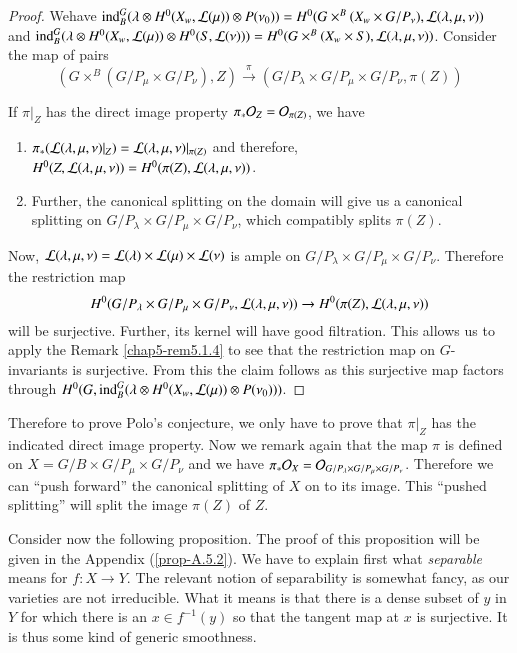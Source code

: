 \begin{proof}
We\pageoriginale have\label{page59} $\operatorname{ind}^{G}_{B}(\lambda\otimes
H^{0}(X_{w},\mathcal{L}(\mu))\otimes P(\nu_{0}))=H^{0}(G\times^{B}(X_{w}\times
G/P_{\nu}),\mathcal{L}(\lambda,\mu,\nu))$ and $\operatorname{ind}^{G}_{B}(\lambda\otimes
H^{0}(X_{w},\mathcal{L}(\mu))\otimes
H^{0}(S,\mathcal{L}(\nu)))=H^{0}(G\times^{B}(X_{w}\times
S),\mathcal{L}(\lambda,\mu,\nu))$. Consider the map of pairs
$$
(G\times^{B}(G/P_{\mu}\times
G/P_{\nu}),Z)\xrightarrow{\pi}(G/P_{\lambda}\times G/P_{\mu}\times
G/P_{\nu},\pi(Z)) 
$$

If $\pi|_{Z}$ has the direct image property
$\pi_{\ast}\mathcal{O}_{Z}=\mathcal{O}_{\pi(Z)}$, we have
\begin{enumerate}
\item
  $\pi_{\ast}(\mathcal{L}(\lambda,\mu,\nu)|_{Z})=\mathcal{L}(\lambda,\mu,\nu)|_{\pi(Z)}$
  and therefore,
  $H^{0}(Z,\mathcal{L}(\lambda,\mu,\nu))=H^{0}(\pi(Z),\mathcal{L}(\lambda,\mu,\nu))$. 

\item Further, the canonical splitting on the domain will give us a
  canonical splitting on $G/P_{\lambda}\times G/P_{\mu}\times
  G/P_{\nu}$, which compatibly splits $\pi(Z)$.
\end{enumerate}

Now, $\mathcal{L}(\lambda,\mu,\nu)=\mathcal{L}(\lambda)\times \mathcal{L}(\mu)\times \mathcal{L}(\nu)$ is
ample on $G/P_{\lambda}\times G/P_{\mu}\times G/P_{\nu}$. Therefore
the restriction map 
$$
H^{0}(G/P_{\lambda}\times G/P_{\mu}\times
G/P_{\nu},\mathcal{L}(\lambda,\mu,\nu))\to H^{0}(\pi(Z),\mathcal{L}(\lambda,\mu,\nu))
$$
will be surjective. Further, its kernel will have good
filtration. This allows us to apply the Remark \ref{chap5-rem5.1.4} to
see that the restriction map on $G$-invariants is surjective. From
this the claim follows as this surjective map factors through
$H^{0}(G,\operatorname{ind}^{G}_{B}(\lambda\otimes H^{0}(X_{w},\mathcal{L}(\mu))\otimes
P(\nu_{0})))$. 
\end{proof}

Therefore to prove Polo's conjecture, we only have to prove that
$\pi|_{Z}$ has the indicated direct image property. Now we remark
again that the map $\pi$ is defined on $X=G/B\times G/P_{\mu}\times
G/P_{\nu}$ and we have $\pi_{\ast}\mathcal{O}_{X}=\mathcal{O}_{G/P_{\lambda}\times
  G/P_{\mu}\times G/P_{\nu}}$. Therefore we can ``push forward'' the
canonical splitting of $X$ on to its image. This ``pushed splitting''
will split the image $\pi(Z)$ of $Z$.

Consider now the following proposition. The proof of this proposition
will be given in the Appendix (\ref{prop-A.5.2}). We have to explain first what
{\em separable} means for $f:X\to Y$. The relevant notion of
separability is somewhat fancy, as our varieties are not
irreducible. What it means is that there is a dense subset of $y$ in
$Y$ for which there is an $x\in f^{-1}(y)$ so that the tangent map at
$x$ is surjective. It is thus some kind of generic smoothness.

